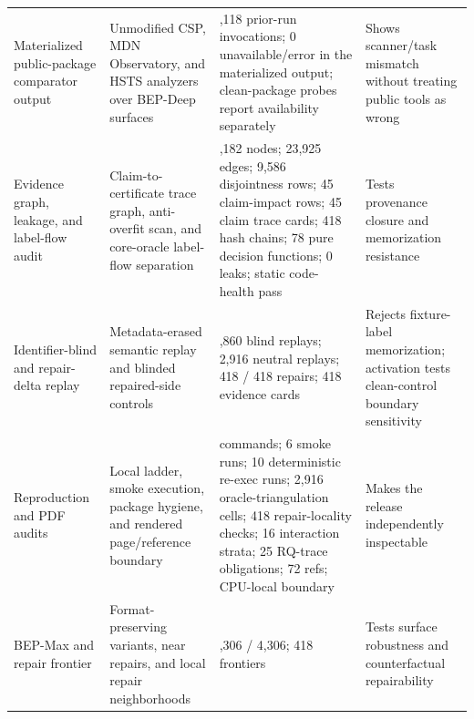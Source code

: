\begin{table}[t]
\begin{tabular}{>{\raggedright\arraybackslash}p{}>{\raggedright\arraybackslash}p{}>{\raggedright\arraybackslash}p{}>{\raggedright\arraybackslash}p{}}
Materialized public-package comparator output & Unmodified CSP, MDN Observatory, and HSTS analyzers over BEP-Deep surfaces & 4,118 prior-run invocations; 0 unavailable/error in the materialized output; clean-package probes report availability separately & Shows scanner/task mismatch without treating public tools as wrong \\
Evidence graph, leakage, and label-flow audit & Claim-to-certificate trace graph, anti-overfit scan, and core-oracle label-flow separation & 15,182 nodes; 23,925 edges; 9,586 disjointness rows; 45 claim-impact rows; 45 claim trace cards; 418 hash chains; 78 pure decision functions; 0 leaks; static code-health pass & Tests provenance closure and memorization resistance \\
Identifier-blind and repair-delta replay & Metadata-erased semantic replay and blinded repaired-side controls & 4,860 blind replays; 2,916 neutral replays; 418 / 418 repairs; 418 evidence cards & Rejects fixture-label memorization; activation tests clean-control boundary sensitivity \\
Reproduction and PDF audits & Local ladder, smoke execution, package hygiene, and rendered page/reference boundary & 101 commands; 6 smoke runs; 10 deterministic re-exec runs; 2,916 oracle-triangulation cells; 418 repair-locality checks; 16 interaction strata; 25 RQ-trace obligations; 72 refs; CPU-local boundary & Makes the release independently inspectable \\
BEP-Max and repair frontier & Format-preserving variants, near repairs, and local repair neighborhoods & 4,306 / 4,306; 418 frontiers & Tests surface robustness and counterfactual repairability \\
\bottomrule
\end{tabular}
\end{table}

